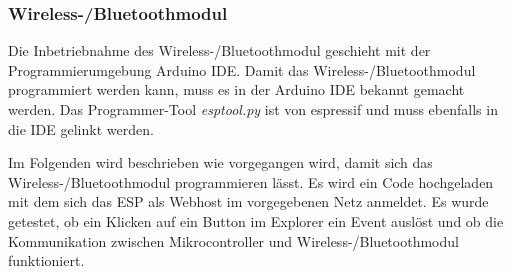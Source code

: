 \subsubsection{Wireless-/Bluetoothmodul}
\label{subsubsec:Inbetriebnahme_ESP}

Die Inbetriebnahme des Wireless-/Bluetoothmodul geschieht mit der Programmierumgebung Arduino IDE. Damit das Wireless-/Bluetoothmodul programmiert werden kann, muss es in der Arduino IDE bekannt gemacht werden. Das Programmer-Tool \textit{esptool.py} ist von espressif und muss ebenfalls in die IDE gelinkt werden.

Im Folgenden wird beschrieben wie vorgegangen wird, damit sich das Wireless-/Bluetoothmodul programmieren lässt. Es wird ein Code hochgeladen mit dem sich das ESP als Webhost im vorgegebenen Netz anmeldet. Es wurde getestet, ob ein Klicken auf ein Button im Explorer ein Event auslöst und ob die Kommunikation zwischen Mikrocontroller und Wireless-/Bluetoothmodul funktioniert.

